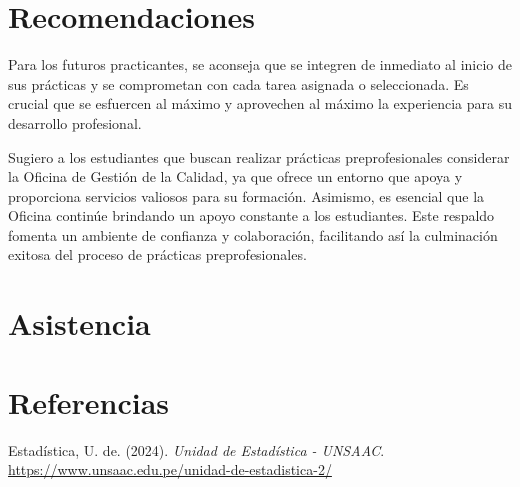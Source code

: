 \documentclass[
  12pt,
  letterpaper,
]{scrreprt}
\newlength{\cslhangindent}
\newenvironment{CSLReferences}[2] %
 {\begin{list}{}{%
  \setlength{\itemindent}{0pt}
  \setlength{\leftmargin}{0pt}
  \setlength{\parsep}{0pt}
  \ifodd #1
   \setlength{\leftmargin}{\cslhangindent}
   \setlength{\itemindent}{-1\cslhangindent}
  \fi
  \setlength{\itemsep}{#2\baselineskip}}}
 {\end{list}}
\begin{document}
\chapter{Recomendaciones}\label{recomendaciones}

Para los futuros practicantes, se aconseja que se integren de inmediato
al inicio de sus prácticas y se comprometan con cada tarea asignada o
seleccionada. Es crucial que se esfuercen al máximo y aprovechen al
máximo la experiencia para su desarrollo profesional.

Sugiero a los estudiantes que buscan realizar prácticas preprofesionales
considerar la Oficina de Gestión de la Calidad, ya que ofrece un entorno
que apoya y proporciona servicios valiosos para su formación. Asimismo,
es esencial que la Oficina continúe brindando un apoyo constante a los
estudiantes. Este respaldo fomenta un ambiente de confianza y
colaboración, facilitando así la culminación exitosa del proceso de
prácticas preprofesionales.


\chapter{Asistencia}\label{asistencia}


\chapter*{Referencias}\label{referencias}


\label{refs}
\begin{CSLReferences}{1}{0}
Estadística, U. de. (2024). \emph{Unidad de Estadística - UNSAAC}.
\url{https://www.unsaac.edu.pe/unidad-de-estadistica-2/}

\end{CSLReferences}
\end{document}
